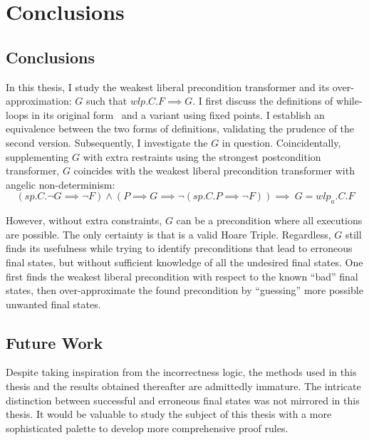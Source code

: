 \chapter{Conclusions}\label{ch:conclusion} %

\section{Conclusions}
In this thesis, I study the weakest liberal precondition transformer and its over-approximation: $G$ such that $wlp.C.F\implies G$. 
I first discuss the definitions of while-loops in its original form~\cite{dijkstra75} and a variant using fixed points. 
I establish an equivalence between the two forms of definitions, validating the prudence of the second version. 
Subsequently, I investigate the $G$ in question. 
Coincidentally, supplementing $G$ with extra restraints using the strongest postcondition transformer, $G$ coincides with the weakest liberal precondition transformer with angelic non-determinism: 
$$(sp.C.\neg G {\implies} \neg F) \wedge
(P{\implies} G \implies \neg(sp.C.P {\implies} \neg F) )
\implies\ G = wlp_a.C.F$$

However, without extra constraints, $G$ can be a precondition where all executions are possible. 
The only certainty is that  is a valid Hoare Triple. 
Regardless, $G$ still finds its usefulness while trying to identify preconditions that lead to erroneous final states, but without sufficient knowledge of all the undesired final states. 
One first finds the weakest liberal precondition with respect to the known ``bad'' final states, then over-approximate the found precondition by ``guessing'' more possible unwanted final states. 

\section{Future Work}
Despite taking inspiration from the incorrectness logic, the methods used in this thesis and the results obtained thereafter are admittedly immature.
The intricate distinction between successful and erroneous final states was not mirrored in this thesis. %
It would be valuable to study the subject of this thesis with a more sophisticated palette to develop more comprehensive proof rules. 

